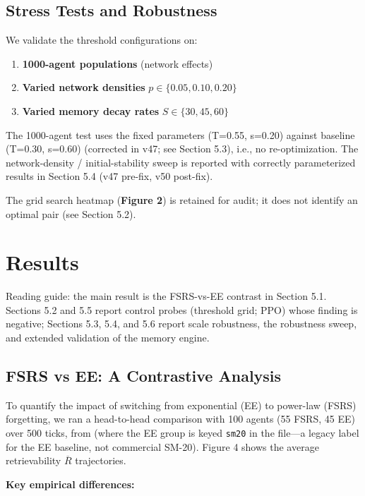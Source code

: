 \documentclass[11pt]{article}
\begin{document}
\subsection{Stress Tests and Robustness}
We validate the threshold configurations on:

\begin{enumerate}
\item \textbf{1000-agent populations} (network effects)
\item \textbf{Varied network densities} $p \in \{0.05, 0.10, 0.20\}$
\item \textbf{Varied memory decay rates} $S \in \{30, 45, 60\}$
\end{enumerate}

The 1000-agent test uses the fixed parameters (T=0.55, s=0.20) against baseline (T=0.30, s=0.60) (corrected in v47; see Section 5.3), i.e., no re-optimization. The network-density / initial-stability sweep is reported with correctly parameterized results in Section 5.4 (v47 pre-fix, v50 post-fix).

The grid search heatmap (\textbf{Figure 2}) is retained for audit; it does not identify an optimal pair (see Section 5.2).

\section{Results}
Reading guide: the main result is the FSRS-vs-EE contrast in Section 5.1. Sections 5.2 and 5.5 report control probes (threshold grid; PPO) whose finding is negative; Sections 5.3, 5.4, and 5.6 report scale robustness, the robustness sweep, and extended validation of the memory engine.

\subsection{FSRS vs EE: A Contrastive Analysis}
To quantify the impact of switching from exponential (EE) to power-law (FSRS) forgetting, we ran a head-to-head comparison with 100 agents (55 FSRS, 45 EE) over 500 ticks, from  (where the EE group is keyed \texttt{sm20} in the file---a legacy label for the EE baseline, not commercial SM-20). Figure 4 shows the average retrievability $\overline{R}$ trajectories.

\textbf{Key empirical differences:}
\end{document}
